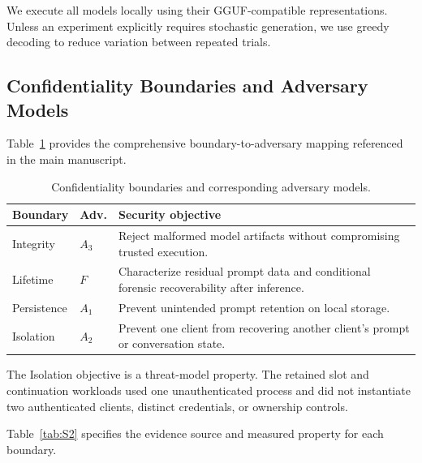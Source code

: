 We execute all models locally using their GGUF-compatible
representations. Unless an experiment explicitly requires stochastic
generation, we use greedy decoding to reduce variation between repeated
trials.

\subsection{Confidentiality Boundaries and Adversary Models}
\label{app:boundary_summary}

Table~\ref{tab:S1} provides the comprehensive boundary-to-adversary
mapping referenced in the main manuscript.

\begin{table}[!t]
\centering
\small
\caption{Confidentiality boundaries and corresponding adversary models.}
\label{tab:S1}
\setlength{\tabcolsep}{3pt}
\begin{tabular}{p{1.7cm}p{0.7cm}p{4.5cm}}
\toprule
\textbf{Boundary} & \textbf{Adv.} & \textbf{Security objective} \\
\midrule
Integrity    & ${A}_3$ & Reject malformed model artifacts without
                         compromising trusted execution. \\
Lifetime     & $F$      & Characterize residual prompt data and conditional
                         forensic recoverability after inference. \\
Persistence  & ${A}_1$ & Prevent unintended prompt retention on local
                         storage. \\
Isolation    & ${A}_2$ & Prevent one client from recovering another
                         client's prompt or conversation state. \\
\bottomrule
\end{tabular}
\end{table}

The Isolation objective is a threat-model property. The retained slot and
continuation workloads used one unauthenticated process and did not instantiate
two authenticated clients, distinct credentials, or ownership controls.

Table~\ref{tab:S2} specifies the evidence source and
measured property for each boundary.

